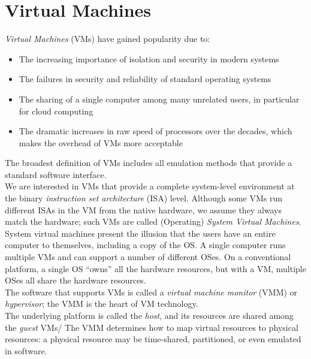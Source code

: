 \documentclass[12pt]{article}
\theoremstyle{definition}
\begin{document}
  \section{Virtual Machines}
  \emph{Virtual Machines} (VMs) have gained popularity due to:
  \begin{itemize}
    \item The increasing importance of isolation and security in modern systems
    \item The failures in security and reliability of standard operating systems
    \item The sharing of a single computer among many unrelated users, in particular for cloud computing
    \item The dramatic increases in raw speed of processors over the decades, which makes the overhead of VMs more acceptable
  \end{itemize}
  The broadest definition of VMs includes all emulation methods that provide a standard software interface. \\
  We are interested in VMs that provide a complete system-level environment at the binary \emph{instruction set architecture} (ISA) level.
  Although some VMs run different ISAs in the VM from the native hardware, we assume they always match the hardware;
  such VMs are called (Operating) \emph{System Virtual Machines}. \\

  System virtual machines present the illusion that the users have an entire computer to themselves, including a copy of the OS.
  A single computer runs multiple VMs and can support a number of different OSes.
  On a conventional platform, a single OS ``owns'' all the hardware resources, but with a VM, multiple OSes all share the hardware resources. \\

  The software that supports VMs is called a \emph{virtual machine monitor} (VMM) or \emph{hypervisor};
  the VMM is the heart of VM technology. \\
  The underlying platform is called the \emph{host}, and its resources are shared among the \emph{guest} VMs/
  The VMM determines how to map virtual resources to physical resources: a physical resource may be time-shared, partitioned, or even emulated in software. \\
\end{document}
